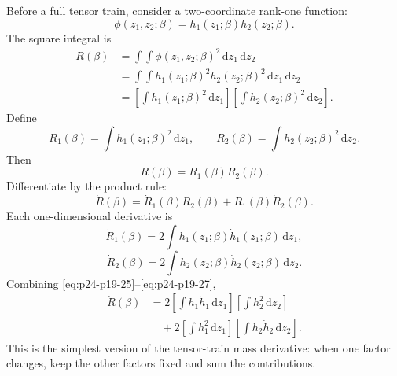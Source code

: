 \documentclass[11pt]{article}
\numberwithin{equation}{section}
\newcommand{\dd}{\,\mathrm d}
\begin{document}
Before a full tensor train, consider a two-coordinate rank-one function:
\begin{equation}
    \phi(z_1,z_2;\beta)=h_1(z_1;\beta)h_2(z_2;\beta).
    \label{eq:p24-p19-21}
\end{equation}
The square integral is
\begin{equation}
\begin{aligned}
    R(\beta)
    &=
    \int\!\!\int
    \phi(z_1,z_2;\beta)^2\dd z_1\dd z_2\\
    &=
    \int\!\!\int
    h_1(z_1;\beta)^2h_2(z_2;\beta)^2\dd z_1\dd z_2\\
    &=
    \left[\int h_1(z_1;\beta)^2\dd z_1\right]
    \left[\int h_2(z_2;\beta)^2\dd z_2\right].
\end{aligned}
\label{eq:p24-p19-22}
\end{equation}
Define
\begin{equation}
    R_1(\beta)=\int h_1(z_1;\beta)^2\dd z_1,
    \qquad
    R_2(\beta)=\int h_2(z_2;\beta)^2\dd z_2.
    \label{eq:p24-p19-23}
\end{equation}
Then
\begin{equation}
    R(\beta)=R_1(\beta)R_2(\beta).
    \label{eq:p24-p19-24}
\end{equation}
Differentiate by the product rule:
\begin{equation}
    \dot R(\beta)=\dot R_1(\beta)R_2(\beta)+R_1(\beta)\dot R_2(\beta).
    \label{eq:p24-p19-25}
\end{equation}
Each one-dimensional derivative is
\begin{equation}
    \dot R_1(\beta)=2\int h_1(z_1;\beta)\dot h_1(z_1;\beta)\dd z_1,
    \label{eq:p24-p19-26}
\end{equation}
\begin{equation}
    \dot R_2(\beta)=2\int h_2(z_2;\beta)\dot h_2(z_2;\beta)\dd z_2.
    \label{eq:p24-p19-27}
\end{equation}
Combining \eqref{eq:p24-p19-25}--\eqref{eq:p24-p19-27},
\begin{equation}
\begin{aligned}
    \dot R(\beta)
    &=
    2
    \left[\int h_1\dot h_1\dd z_1\right]
    \left[\int h_2^2\dd z_2\right]\\
    &\quad+
    2
    \left[\int h_1^2\dd z_1\right]
    \left[\int h_2\dot h_2\dd z_2\right].
\end{aligned}
\label{eq:p24-p19-28}
\end{equation}
This is the simplest version of the tensor-train mass derivative: when one
factor changes, keep the other factors fixed and sum the contributions.
\end{document}

